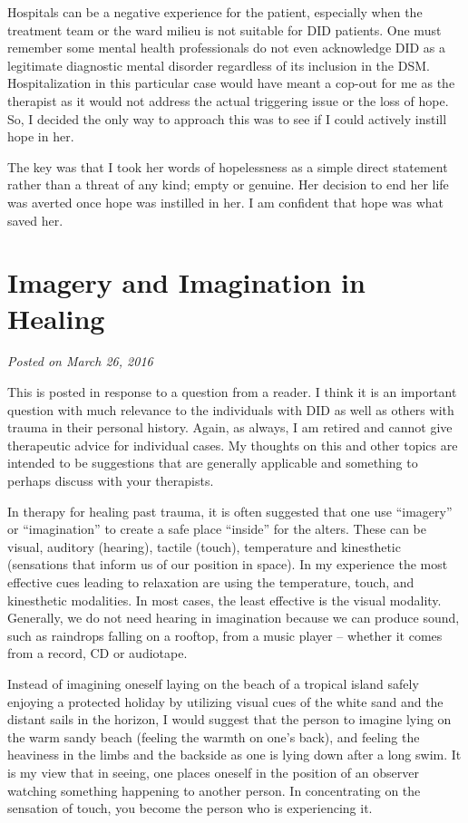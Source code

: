 \documentclass[]{book}
\begin{document}
Hospitals can be a negative experience for the patient, especially when the treatment team or the ward milieu is not suitable for DID patients. One must remember some mental health professionals do not even acknowledge DID as a legitimate diagnostic mental disorder regardless of its inclusion in the DSM. Hospitalization in this particular case would have meant a cop-out for me as the therapist as it would not address the actual triggering issue or the loss of hope. So, I decided the only way to approach this was to see if I could actively instill hope in her.

The key was that I took her words of hopelessness as a simple direct statement rather than a threat of any kind; empty or genuine. Her decision to end her life was averted once hope was instilled in her. I am confident that hope was what saved her.

\hypertarget{imagery-and-imagination-in-healing}{%
\section{Imagery and Imagination in Healing}\label{imagery-and-imagination-in-healing}}

\emph{Posted on March 26, 2016}

This is posted in response to a question from a reader. I think it is an important question with much relevance to the individuals with DID as well as others with trauma in their personal history. Again, as always, I am retired and cannot give therapeutic advice for individual cases. My thoughts on this and other topics are intended to be suggestions that are generally applicable and something to perhaps discuss with your therapists.

In therapy for healing past trauma, it is often suggested that one use ``imagery'' or ``imagination'' to create a safe place ``inside'' for the alters. These can be visual, auditory (hearing), tactile (touch), temperature and kinesthetic (sensations that inform us of our position in space). In my experience the most effective cues leading to relaxation are using the temperature, touch, and kinesthetic modalities. In most cases, the least effective is the visual modality. Generally, we do not need hearing in imagination because we can produce sound, such as raindrops falling on a rooftop, from a music player -- whether it comes from a record, CD or audiotape.

Instead of imagining oneself laying on the beach of a tropical island safely enjoying a protected holiday by utilizing visual cues of the white sand and the distant sails in the horizon, I would suggest that the person to imagine lying on the warm sandy beach (feeling the warmth on one's back), and feeling the heaviness in the limbs and the backside as one is lying down after a long swim. It is my view that in seeing, one places oneself in the position of an observer watching something happening to another person. In concentrating on the sensation of touch, you become the person who is experiencing it.
\end{document}
